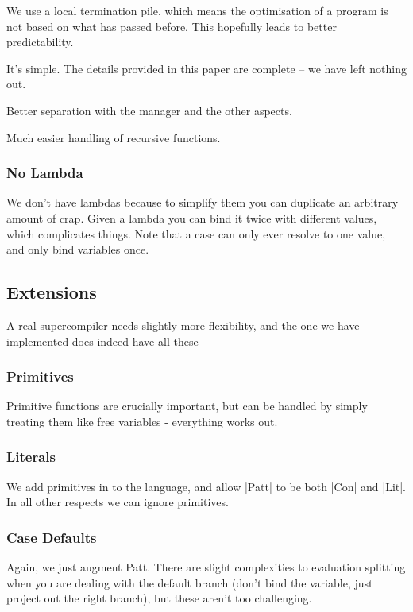 \documentclass{sigplanconf}
\begin{document}
We use a local termination pile, which means the optimisation of a program is not based on what has passed before. This hopefully leads to better predictability.

It's simple. The details provided in this paper are complete -- we have left nothing out.

Better separation with the manager and the other aspects.

Much easier handling of recursive functions.

\subsubsection{No Lambda}
\label{sec:nolambda}

We don't have lambdas because to simplify them you can duplicate an arbitrary amount of crap. Given a lambda you can bind it twice with different values, which complicates things. Note that a case can only ever resolve to one value, and only bind variables once.

\subsection{Extensions}
\label{sec:extensions}

A real supercompiler needs slightly more flexibility, and the one we have implemented does indeed have all these

\subsubsection{Primitives}

Primitive functions are crucially important, but can be handled by simply treating them like free variables - everything works out.

\subsubsection{Literals}

We add primitives in to the language, and allow |Patt| to be both |Con| and |Lit|. In all other respects we can ignore primitives.

\subsubsection{Case Defaults}

Again, we just augment Patt. There are slight complexities to evaluation splitting when you are dealing with the default branch (don't bind the variable, just project out the right branch), but these aren't too challenging.
\end{document}
